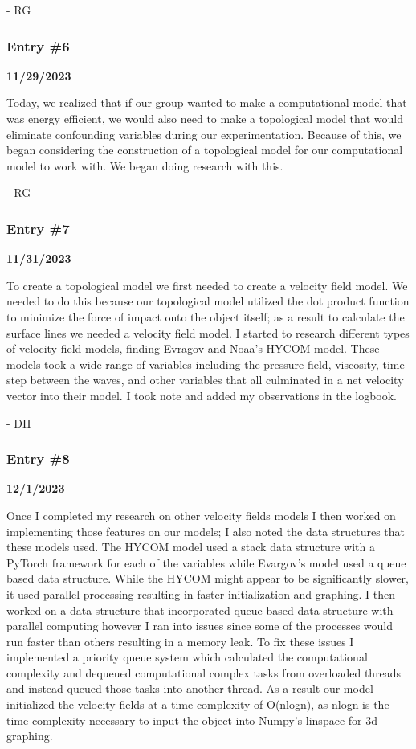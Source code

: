 - RG

\subsubsection{Entry \#6}\label{entry-6}

\textbf{11/29/2023}

Today, we realized that if our group wanted to make a computational
model that was energy efficient, we would also need to make a
topological model that would eliminate confounding variables during our
experimentation. Because of this, we began considering the construction
of a topological model for our computational model to work with. We
began doing research with this.

- RG

\subsubsection{Entry \#7}\label{entry-7}

\textbf{11/31/2023}

To create a topological model we first needed to create a velocity field
model. We needed to do this because our topological model utilized the
dot product function to minimize the force of impact onto the object
itself; as a result to calculate the surface lines we needed a velocity
field model. I started to research different types of velocity field
models, finding Evragov and Noaa's HYCOM model. These models took a wide
range of variables including the pressure field, viscosity, time step
between the waves, and other variables that all culminated in a net
velocity vector into their model. I took note and added my observations
in the logbook.

- DII

\subsubsection{Entry \#8}\label{entry-8}

\textbf{12/1/2023}

Once I completed my research on other velocity fields models I then
worked on implementing those features on our models; I also noted the
data structures that these models used. The HYCOM model used a stack
data structure with a PyTorch framework for each of the variables while
Evargov's model used a queue based data structure. While the HYCOM might
appear to be significantly slower, it used parallel processing resulting
in faster initialization and graphing. I then worked on a data structure
that incorporated queue based data structure with parallel computing
however I ran into issues since some of the processes would run faster
than others resulting in a memory leak. To fix these issues I
implemented a priority queue system which calculated the computational
complexity and dequeued computational complex tasks from overloaded
threads and instead queued those tasks into another thread. As a result
our model initialized the velocity fields at a time complexity of
O(nlogn), as nlogn is the time complexity necessary to input the object
into Numpy's linspace for 3d graphing.

